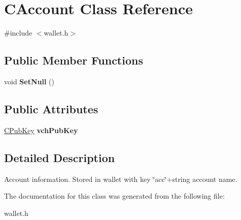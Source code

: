 \hypertarget{class_c_account}{}\section{C\+Account Class Reference}
\label{class_c_account}


{\ttfamily \#include $<$wallet.\+h$>$}

\subsection*{Public Member Functions}
\begin{DoxyCompactItemize}
\item 
\mbox{\label{class_c_account_ac63a4127fd899a21a5916a86588e809a}} 
void {\bfseries Set\+Null} ()
\end{DoxyCompactItemize}
\subsection*{Public Attributes}
\begin{DoxyCompactItemize}
\item 
\mbox{\label{class_c_account_a8bc9b476371009c12a6c25d4c7264de5}} 
\mbox{\hyperlink{class_c_pub_key}{C\+Pub\+Key}} {\bfseries vch\+Pub\+Key}
\end{DoxyCompactItemize}


\subsection{Detailed Description}
Account information. Stored in wallet with key \char`\"{}acc\char`\"{}+string account name. 

The documentation for this class was generated from the following file\+:\begin{DoxyCompactItemize}
\item 
wallet.\+h\end{DoxyCompactItemize}
